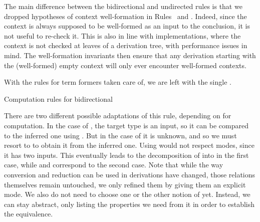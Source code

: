 The main difference between the bidirectional and undirected rules is that we dropped
hypotheses of context well-formation in Rules~ and
. Indeed, since the context is always supposed to be well-formed
as an input to the conclusion, it is not useful to re-check it. This is also in line with implementations, where the context is not checked at leaves of a derivation tree, with performance issues in mind. The well-formation invariants then ensure that any derivation starting with the (well-formed) empty context will only ever encounter well-formed contexts.

With the rules for term formers taken care of,
we are left with the single .
\begin{marginfigure}
  \ContinuedFloat
  \caption{Computation rules for bidirectional }
  \label{fig:bidir-ccw-other}
  \end{marginfigure}
There are two different possible adaptations of this rule, depending on
 for computation.
In the case of , the target type is an input, so
it can be compared to the inferred one using .
But in the case of  it is unknown, and so
we must resort to  to obtain it from the inferred one.
Using  would not respect modes, since it has two inputs.
This eventually leads to the decomposition of  into
 in the first case, while
 and  correspond to the second case.
Note that while the way conversion and reduction can be used in derivations have changed,
those relations themselves remain untouched,
we only refined them by giving them an explicit mode.
We also do not need to choose one or the other notion of  yet. Instead, we can
stay abstract, only listing the properties we need from it in order to establish the
equivalence.

